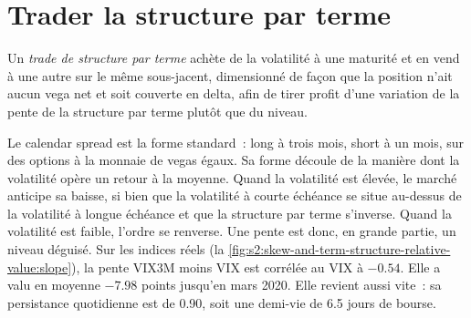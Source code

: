 \section{Trader la structure par terme}

\begin{definition}\label{def:s2:skew-and-term-structure-relative-value:term}
Un \emph{trade de structure par terme} achète de la volatilité à une maturité et en vend à une autre sur le même sous-jacent, dimensionné de façon que
la position n'ait aucun vega net et soit couverte en delta, afin de tirer profit d'une variation de la pente de la structure par terme plutôt que du niveau.
\end{definition}

Le calendar spread est la forme standard~: long à trois mois, short à un mois, sur des options à la monnaie de vegas égaux. Sa forme découle de la manière dont la
volatilité opère un retour à la moyenne. Quand la volatilité est élevée, le marché anticipe sa baisse, si bien que la volatilité à courte échéance se situe au-dessus de la volatilité à longue échéance et que la structure par terme s'inverse. Quand la volatilité est
faible, l'ordre se renverse. Une pente est donc, en grande partie, un niveau déguisé. Sur les indices réels (la \cref{fig:s2:skew-and-term-structure-relative-value:slope}),
la pente VIX3M moins VIX est corrélée au VIX à $-0.54$. Elle a valu en moyenne $-7.98$ points jusqu'en mars 2020. Elle revient aussi vite~: sa persistance
quotidienne est de 0.90, soit une demi-vie de 6.5 jours de bourse.

\begin{omfigure}

\label{fig:s2:skew-and-term-structure-relative-value:slope}
\end{omfigure}

